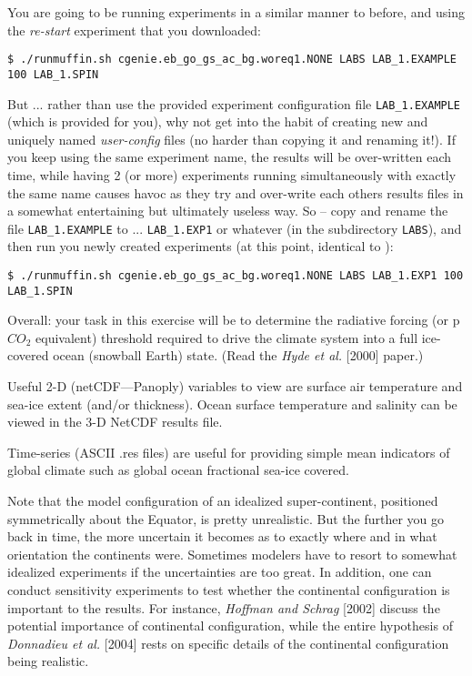 \documentclass[11pt,fleqn]{book} %
\begin{document}
\noindent You are going to be running experiments in a similar manner to before, and using the \textit{re-start} experiment that you downloaded:
\vspace{-1mm}
\small\begin{verbatim}
$ ./runmuffin.sh cgenie.eb_go_gs_ac_bg.woreq1.NONE LABS LAB_1.EXAMPLE 100 LAB_1.SPIN 
\end{verbatim}\normalsize
\noindent But ... rather than use the provided experiment configuration file \texttt{LAB\_1.EXAMPLE} (which is provided for you), why not get into the habit of creating new and uniquely named \textit{user-config} files (no harder than copying it and renaming it!). If you keep using the same experiment name, the results will be over-written each time, while having  2 (or more) experiments running simultaneously with exactly the same name causes havoc as they try and over-write each others results files in a somewhat entertaining but ultimately useless way. So -- copy and rename the file \texttt{LAB\_1.EXAMPLE} to ... \texttt{LAB\_1.EXP1} or whatever (in the subdirectory \texttt{LABS}), and then run you newly created experiments (at this point, identical to ):
\vspace{-1mm}
\small\begin{verbatim}
$ ./runmuffin.sh cgenie.eb_go_gs_ac_bg.woreq1.NONE LABS LAB_1.EXP1 100 LAB_1.SPIN 
\end{verbatim}\normalsize 

Overall: your task in this exercise will be to determine the radiative forcing (or p\(CO_{2}\) equivalent) threshold required to drive the climate system into a full ice-covered ocean (snowball Earth) state. (Read the \textit{Hyde et al.} [2000] paper.)

Useful 2-D (netCDF—Panoply) variables to view are surface air temperature and sea-ice extent (and/or thickness). Ocean surface temperature and salinity can be viewed in the 3-D NetCDF results file.

Time-series (ASCII .res files) are useful for providing simple mean indicators of global climate such as global ocean fractional sea-ice covered. 

Note that the model configuration of an idealized super-continent, positioned symmetrically about the Equator, is pretty unrealistic. But the further you go back in time, the more uncertain it becomes as to exactly where and in what orientation the continents were. Sometimes modelers have to resort to somewhat idealized experiments if the uncertainties are too great. In addition, one can conduct sensitivity experiments to test whether the continental configuration is important to the results. For instance, \textit{Hoffman and Schrag} [2002] discuss the potential importance of continental configuration, while the entire hypothesis of \textit{Donnadieu et al.} [2004] rests on specific details of the continental configuration being realistic.
\end{document}
